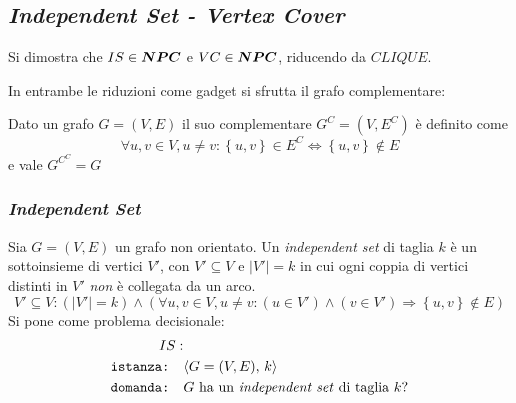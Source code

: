 \subsection{\emph{Independent Set - Vertex Cover}}

Si dimostra che $IS \in \bm{NPC}$ e $VC \in \bm{NPC}$, riducendo da $CLIQUE$.

In entrambe le riduzioni come gadget si sfrutta il grafo complementare:
\begin{definition}
    \label{def:grafocomplementare}
    Dato un grafo 
    $G = (V, E)$
    il suo complementare 
    $G^C = (V, E^C)$
    è definito come
    \begin{equation*}
        \forall u, v \in V, u \ne v :
        \left\{ u,v \right\} \in E^C
        \Leftrightarrow
        \left\{ u,v \right\} \notin E
    \end{equation*}
    e vale $G^{C^{C}} = G$
\end{definition}

\subsubsection{\emph{Independent Set}}

\begin{definition}
    \label{def:indset}
    Sia $G=(V,E)$ un grafo non orientato. Un \emph{independent set} di taglia $k$ è un sottoinsieme di vertici $V'$, con $V' \subseteq V$ e $|V'| = k$
    in cui ogni coppia di vertici distinti in $V'$ \emph{non} è collegata da un arco.
    \begin{equation*}
        V' \subseteq V : 
        \left( |V'| = k \right)
        \wedge
        \left( 
            \forall u, v \in V, u \ne v :
            \left( u \in V' \right) \wedge \left( v \in V' \right)
            \Rightarrow
            \left\{ u,v \right\} \notin E
        \right)
    \end{equation*}
Si pone come problema decisionale:
\begin{align*}
    IS: & \\
    \texttt{istanza:} \quad & \langle G=(V,E), \, k \rangle \\
    \texttt{domanda:} \quad & G \text{ ha un \emph{independent set} di taglia } k?
\end{align*}
\end{definition}

